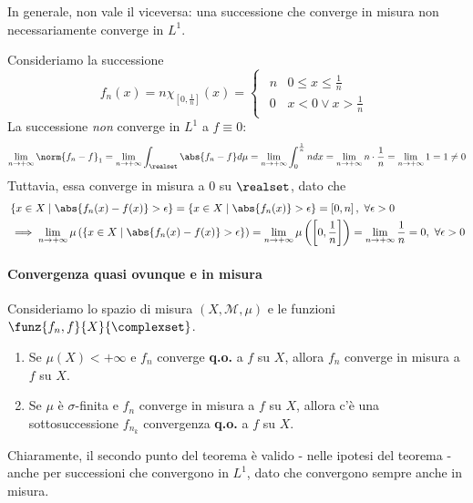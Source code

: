 In generale, non vale il viceversa: una successione che converge in misura non necessariamente converge in $L^1$.
\begin{example}
	Consideriamo la successione
	\begin{equation*}
		f_n(x)=n\chi_{\left[0,\frac{1}{n}\right]}(x)=
		\begin{cases}
			\begin{array}{ll}
				n&0\leq x\leq\frac{1}{n}\\
				0&x< 0\vee x>\frac{1}{n}
			\end{array}
		\end{cases}
	\end{equation*}
	La successione \textit{non} converge in $L^1$ a $f\equiv 0$:
	\begin{equation*}
		\lim_{n\to+\infty}\norm{f_n-f}_1=\lim_{n\to+\infty}\int_{\realset}\abs{f_n-f}d\mu=\lim_{n\to+\infty}\int_{0}^{\frac{1}{n}}ndx=\lim_{n\to+\infty}n\cdot\frac{1}{n}=\lim_{n\to+\infty}1=1\neq 0
	\end{equation*}
	Tuttavia, essa converge in misura a $0$ su $\realset$, dato che
	\begin{align*}
		&\left\{x\in X\mid \abs{f_n(x)-f(x)}>\epsilon\right\}=\left\{x\in X\mid \abs{f_n(x)}>\epsilon\right\}=\left[0,n\right],\ \forall \epsilon>0\\
		&\implies\lim_{n\to+\infty}\mu\left(\left\{x\in X\mid \abs{f_n(x)-f(x)}>\epsilon\right\}\right)=\lim_{n\to+\infty}\mu\left(\left[0,\frac{1}{n}\right]\right)=\lim_{n\to+\infty}\frac{1}{n}=0,\ \forall \epsilon >0
	\end{align*}
\end{example}
\paragraph{Convergenza quasi ovunque e in misura}
\begin{theoremaqed}
	Consideriamo lo spazio di misura $\left(X,\mathcal{M},\mu\right)$ e le funzioni $\funz{f_n,f}{X}{\complexset}$.
	\begin{enumerate}
		\item Se $\mu(X)<+\infty$ e $f_n$ converge \textbf{q.o.} a $f$ su $X$, allora $f_n$ converge in misura a $f$ su $X$.
		\item Se $\mu$ è $\sigma$-finita e $f_n$ converge in misura a $f$ su $X$, allora c'è una sottosuccessione $f_{n_k}$ convergenza \textbf{q.o.} a $f$ su $X$.\qedhere
	\end{enumerate}
\end{theoremaqed}
Chiaramente, il secondo punto del teorema è valido - nelle ipotesi del teorema - anche per successioni che convergono in $L^1$, dato che convergono sempre anche in misura.